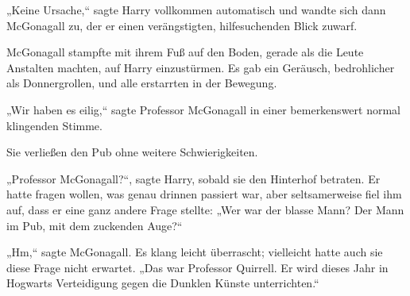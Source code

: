 „Keine Ursache,“ sagte Harry vollkommen automatisch und wandte sich dann McGonagall zu, der er einen verängstigten, hilfesuchenden Blick zuwarf.

McGonagall stampfte mit ihrem Fuß auf den Boden, gerade als die Leute Anstalten machten, auf Harry einzustürmen. Es gab ein Geräusch, bedrohlicher als Donnergrollen, und alle erstarrten in der Bewegung.

„Wir haben es eilig,“ sagte Professor McGonagall in einer bemerkenswert normal klingenden Stimme.

Sie verließen den Pub ohne weitere Schwierigkeiten.

„Professor McGonagall?“, sagte Harry, sobald sie den Hinterhof betraten. Er hatte fragen wollen, was genau drinnen passiert war, aber seltsamerweise fiel ihm auf, dass er eine ganz andere Frage stellte: „Wer war der blasse Mann? Der Mann im Pub, mit dem zuckenden Auge?“

„Hm,“ sagte McGonagall. Es klang leicht überrascht; vielleicht hatte auch sie diese Frage nicht erwartet. „Das war Professor Quirrell. Er wird dieses Jahr in Hogwarts Verteidigung gegen die Dunklen Künste unterrichten.“

